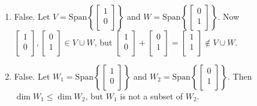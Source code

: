 \documentclass[12pt,letterpaper]{article}
\begin{document}
\begin{enumerate}
\begin{enumerate}
\item False. Let $V=\text{Span}\left\{\begin{bmatrix} 1\\ 0\\ \end{bmatrix} \right\}$ and $W=\text{Span}\left\{\begin{bmatrix} 0\\ 1\\ \end{bmatrix} \right\}$. Now $\begin{bmatrix} 1\\ 0\\ \end{bmatrix}, \begin{bmatrix} 0\\ 1\\ \end{bmatrix} \in V\cup W$, but $\begin{bmatrix} 1\\ 0\\ \end{bmatrix}+ \begin{bmatrix} 0\\ 1\\ \end{bmatrix}=\begin{bmatrix} 1\\ 1\\ \end{bmatrix}\not \in V \cup W.$
\item False. Let $W_1=\text{Span}\left\{\begin{bmatrix} 1\\ 0\\ \end{bmatrix} \right\}$ and $W_2=\text{Span}\left\{\begin{bmatrix} 0\\ 1\\ \end{bmatrix} \right\}.$ Then $\dim W_1 \leq \dim W_2$, but $W_1$ is not a subset of $W_2$.

\end{enumerate}
\end{enumerate}
\end{document}
